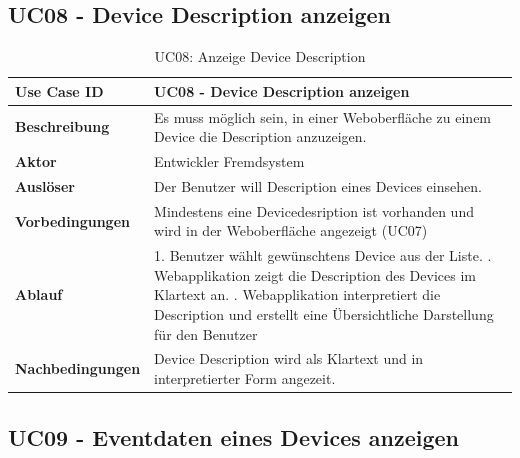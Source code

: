 \subsection{UC08 - Device Description anzeigen}
\begin{table}[H]
\begin{tabularx}{\textwidth}{|l|X|}

 \hline
 {\bf Use Case ID }    & UC08 - Device Description anzeigen \\  \hline
 {\bf Beschreibung }   & Es muss möglich sein, in einer Weboberfläche zu einem Device die Description anzuzeigen. \\ \hline
 {\bf Aktor }          & Entwickler Fremdsystem \\ \hline
 {\bf Auslöser }       & Der Benutzer will Description eines Devices einsehen. \\ \hline
 {\bf Vorbedingungen } & Mindestens eine Devicedesription ist vorhanden und wird in der Weboberfläche angezeigt (UC07) \\ \hline
 {\bf Ablauf }         & 
     1. Benutzer wählt gewünschtens Device aus der Liste. \newline
     2. Webapplikation zeigt die Description des Devices im Klartext an. \newline
     3. Webapplikation interpretiert die Description und erstellt eine Übersichtliche Darstellung für den Benutzer \\ \hline
 {\bf Nachbedingungen} & Device Description wird als Klartext und in interpretierter Form angezeit.\\ \hline
  
\end{tabularx}
\caption{UC08: Anzeige Device Description}
\end{table}

\subsection{UC09 - Eventdaten eines Devices anzeigen}

